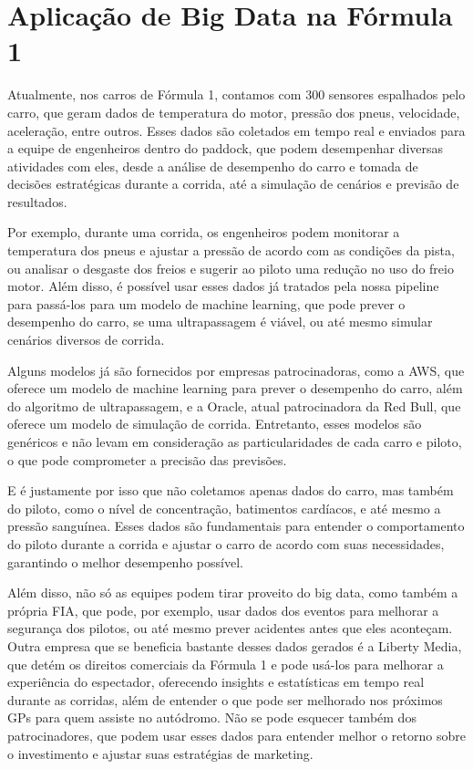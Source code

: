 \documentclass[12pt, %
openright, 
oneside, %
a4paper,    %
brazil]{facom-ufu-abntex2}
\begin{document}
\section{Aplicação de Big Data na Fórmula 1}
Atualmente, nos carros de Fórmula 1, contamos com 300 sensores espalhados pelo carro, que geram dados de temperatura do motor, pressão 
dos pneus, velocidade, aceleração, entre outros. Esses dados são coletados em tempo real e enviados para a equipe de engenheiros dentro do paddock,
que podem desempenhar diversas atividades com eles, desde a análise de desempenho do carro e tomada de decisões estratégicas durante a 
corrida, até a simulação de cenários e previsão de resultados.

Por exemplo, durante uma corrida, os engenheiros podem monitorar a temperatura dos pneus e ajustar a pressão de acordo com as 
condições da pista, ou analisar o desgaste dos freios e sugerir ao piloto uma redução no uso do freio motor. Além disso, é possível
usar esses dados já tratados pela nossa pipeline para passá-los para um modelo de machine learning, que pode prever o desempenho do carro,
se uma ultrapassagem é viável, ou até mesmo simular cenários diversos de corrida.

Alguns modelos já são fornecidos por empresas patrocinadoras, como a AWS, que oferece um modelo de machine learning para prever o 
desempenho do carro, além do algoritmo de ultrapassagem, e a Oracle, atual patrocinadora da Red Bull, que oferece um modelo de simulação
de corrida. Entretanto, esses modelos são genéricos e não levam em consideração as particularidades de cada carro e piloto, o que pode
comprometer a precisão das previsões.

E é justamente por isso que não coletamos apenas dados do carro, mas também do piloto, como o nível de concentração, batimentos cardíacos,
e até mesmo a pressão sanguínea. Esses dados são fundamentais para entender o comportamento do piloto durante a corrida e ajustar o carro
de acordo com suas necessidades, garantindo o melhor desempenho possível.

Além disso, não só as equipes podem tirar proveito do big data, como também a própria FIA, que pode, por exemplo, usar dados dos eventos
para melhorar a segurança dos pilotos, ou até mesmo prever acidentes antes que eles aconteçam. Outra empresa que se beneficia bastante desses
dados gerados é a Liberty Media, que detém os direitos comerciais da Fórmula 1 e pode usá-los para melhorar a experiência do espectador,
oferecendo insights e estatísticas em tempo real durante as corridas, além de entender o que pode ser melhorado nos próximos GPs para quem assiste
no autódromo. Não se pode esquecer também dos patrocinadores, que podem usar esses dados para entender melhor o retorno sobre o investimento
e ajustar suas estratégias de marketing.
\end{document}

